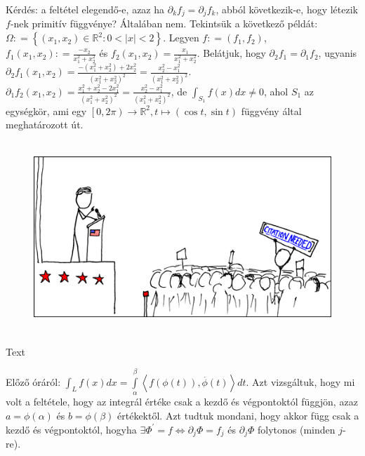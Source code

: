 \documentclass[12pt,a4paper]{scrartcl}
\newenvironment{ajanlofig}{\begin{figure}\begin{center}}{
\end{center}\end{figure}}
\begin{document}
Kérdés: a feltétel elegendő-e, azaz ha
\(\partial_{k}f_{j} = \partial_{j}f_{k}\), abból következik-e, hogy
létezik \(f\)-nek primitív függvénye? Általában nem. Tekintsük a
következő példát:
\(\Omega: = \left\{ {\left( {x_{1},x_{2}} \right) \in {\mathbb{R}}^{2}:0 < \left| x \right| < 2} \right\}\).
Legyen \(f: = \left( {f_{1},f_{2}} \right)\),
\(f_{1}\left( {x_{1},x_{2}} \right): = \frac{- x_{2}}{x_{1}^{2} + x_{2}^{2}}\)
és
\(f_{2}\left( {x_{1},x_{2}} \right) = \frac{x_{1}}{x_{1}^{2} + x_{2}^{2}}\).
Belátjuk, hogy \(\partial_{2}f_{1} = \partial_{1}f_{2}\), ugyanis
\(\partial_{2}f_{1}\left( {x_{1},x_{2}} \right) = \frac{- \left( {x_{1}^{2} + x_{2}^{2}} \right) + 2x_{2}^{2}}{\left( {x_{1}^{2} + x_{2}^{2}} \right)^{2}} = \frac{x_{2}^{2} - x_{1}^{2}}{\left( {x_{1}^{2} + x_{2}^{2}} \right)^{2}}\).
\(\partial_{1}f_{2}\left( {x_{1},x_{2}} \right) = \frac{x_{1}^{2} + x_{2}^{2} - 2x_{1}^{2}}{\left( {x_{1}^{2} + x_{2}^{2}} \right)^{2}} = \frac{x_{2}^{2} - x_{1}^{2}}{\left( {x_{1}^{2} + x_{2}^{2}} \right)^{2}}\),
de \({\int_{S_{1}}{f\left( x \right)dx}} \neq 0\), ahol \(S_{1}\) az
egységkör, ami egy
\(\left. \left\lbrack {0,2\pi} \right)\rightarrow{\mathbb{R}}^{2},t\mapsto\left( {\cos t,\sin t} \right) \right.\)
függvény által meghatározott út.

\begin{ajanlo}

\begin{ajanlofig}

\href{https://xkcd.com}{\includegraphics[width=5.20833in,height=2.82292in]{wikipedian_protester.png}}

\end{ajanlofig}

Text

\end{ajanlo}

Előző óráról:
\({\int_{L}{f\left( x \right)dx}} = {\int\limits_{\alpha}^{\beta}{\left\langle {f\left( {\phi\left( t \right)} \right),\overset{.}{\phi}\left( t \right)} \right\rangle dt}}\).
Azt vizsgáltuk, hogy mi volt a feltétele, hogy az integrál értéke csak a
kezdő és végpontoktól függjön, azaz \(a = \phi\left( \alpha \right)\) és
\(b = \phi\left( \beta \right)\) értékektől. Azt tudtuk mondani, hogy
akkor függ csak a kezdő és végpontoktól, hogyha
\(\left. \exists\Phi^{\prime} = f\Leftrightarrow\partial_{j}\Phi = f_{j} \right.\)
és \(\partial_{j}\Phi\) folytonos (minden \(j\)-re).
\end{document}
